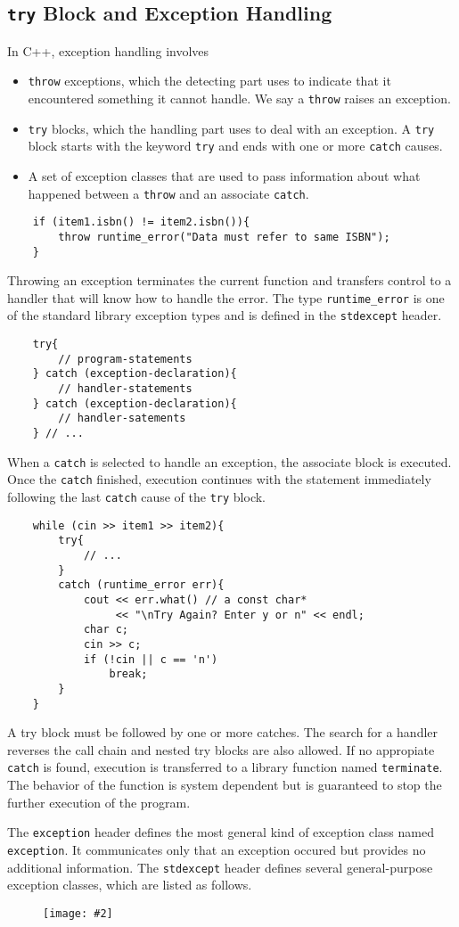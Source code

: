 \documentclass[11pt]{ctexart}
\newcommand{\fpicture}[3][]{\begin{figure}[H]\centering\texttt{[image: \#2]}\ifthenelse{\isempty{#1}}{}{\caption{#1}}\end{figure}}
\begin{document}
\subsection{\texttt{try} Block and Exception Handling}
In C++, exception handling involves
\begin{itemize}
    \item \verb|throw| exceptions, which the detecting part uses to indicate that it encountered something it cannot handle. We say a \verb|throw| raises an exception.
    \item \verb|try| blocks, which the handling part uses to deal with an exception. A \verb|try| block starts with the keyword \verb|try| and ends with one or more \verb|catch| causes.
    \item A set of exception classes that are used to pass information about what happened between a \verb|throw| and an associate \verb|catch|.
\end{itemize}
\begin{lstlisting}
    if (item1.isbn() != item2.isbn()){
        throw runtime_error("Data must refer to same ISBN");
    }
\end{lstlisting}
\par Throwing an exception terminates the current function and transfers control to a handler that will know how to handle the error. The type \verb|runtime_error| is one of the standard library exception types and is defined in the \verb|stdexcept| header.
\begin{lstlisting}
    try{
        // program-statements
    } catch (exception-declaration){
        // handler-statements
    } catch (exception-declaration){
        // handler-satements
    } // ...
\end{lstlisting}
When a \verb|catch| is selected to handle an exception, the associate block is executed. Once the \verb|catch| finished, execution continues with the statement immediately following the last \verb|catch| cause of the \verb|try| block.
\begin{lstlisting}
    while (cin >> item1 >> item2){
        try{
            // ...
        }
        catch (runtime_error err){
            cout << err.what() // a const char*
                 << "\nTry Again? Enter y or n" << endl;
            char c;
            cin >> c;
            if (!cin || c == 'n')
                break;
        }
    }
\end{lstlisting}
A try block must be followed by one or more catches. The search for a handler reverses the call chain and nested try blocks are also allowed. If no appropiate \verb|catch| is found, execution is transferred to a library function named \verb|terminate|. The behavior of the function is system dependent but is guaranteed to stop the further execution of the program.\par The \verb|exception| header defines the most general kind of exception class named \verb|exception|. It communicates only that an exception occured but provides no additional information. The \verb|stdexcept| header defines several general-purpose exception classes, which are listed as follows.
\fpicture{2022.04.30}{1.0}
\end{document}
